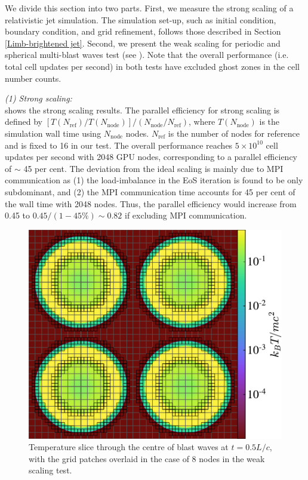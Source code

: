 \documentclass[twocolumn]{aastex63}
\begin{document}
We divide this section into two parts. First, we measure the strong scaling of a relativistic jet simulation. The simulation set-up, such as initial condition, boundary condition, and grid refinement, follows those described in Section \ref{Limb-brightened jet}. Second, we present the weak scaling for periodic and spherical multi-blast waves test (see ). Note that the overall performance (i.e. total cell updates per second) in both tests have excluded ghost zones in the cell number counts.


    \emph{(1) Strong scaling:}\\
     shows the strong scaling results. The parallel efficiency for strong scaling is defined by $\left[T\left(N_{\text{ref}}\right)/T\left(N_{\text{node}}\right)\right]/\left(N_{\text{node}}/N_{\text{ref}}\right)$, where  $T(N_{\text{node}})$ is the simulation wall time using $N_{\text{node}}$ nodes. $N_{\text{ref}}$ is the number of nodes for reference and is fixed to 16 in our test. The overall performance reaches $5\times 10^{10}$ cell updates per second with 2048 GPU nodes, corresponding to a parallel efficiency of $\sim$ 45 per cent. The deviation from the ideal scaling is mainly due to MPI communication as (1) the load-imbalance in the EoS iteration is found to be only subdominant, and (2) the MPI communication time accounts for 45 per cent of the wall time with 2048 nodes. Thus, the parallel efficiency would increase from 0.45 to $0.45/(1-45\%)\sim 0.82$ if excluding MPI communication.

\begin{figure}
\includegraphics[width=\columnwidth]{fig__weak_scaling.pdf}
\centering
\caption{Temperature slice through the centre of blast waves at $t=0.5L/c$, with the grid patches overlaid in the case of 8 nodes in the weak scaling test.}
\label{fig:multi-blast waves}
\end{figure}
\end{document}
